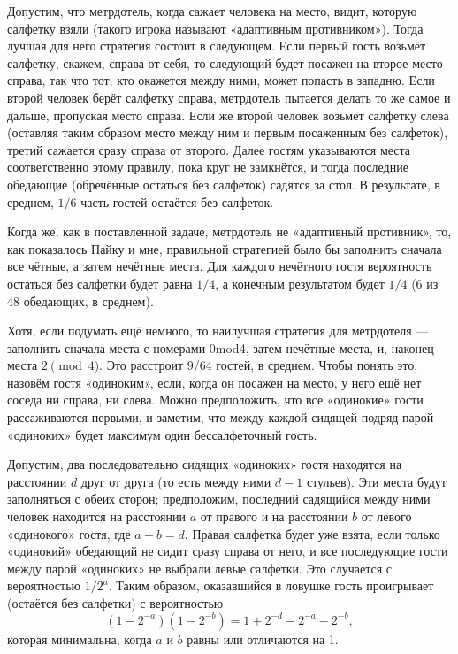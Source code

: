 Допустим, что метрдотель, когда сажает человека на место, видит, которую салфетку взяли (такого игрока называют «адаптивным противником»). %
Тогда лучшая для него стратегия состоит в следующем.
Если первый гость возьмёт салфетку, скажем, справа от себя, то следующий будет посажен на второе место справа, так что тот, кто окажется между ними, может попасть в западню.
Если второй человек берёт салфетку справа, метрдотель пытается делать то же самое и дальше, пропуская место справа.
Если же второй человек возьмёт салфетку слева (оставляя таким образом место между ним и первым посаженным без салфеток), третий сажается сразу справа от второго.
Далее гостям указываются места соответственно этому правилу, пока круг не замкнётся, и тогда последние обедающие (обречённые остаться без салфеток) садятся за стол.
В результате, в среднем, $1/6$ часть гостей остаётся без салфеток.

Когда же, как в поставленной задаче, метрдотель не «адаптивный противник», то, как показалось Пайку и мне, правильной стратегией было бы заполнить сначала все чётные, а затем нечётные места.
Для каждого нечётного гостя вероятность остаться без салфетки будет равна $1/4$, %
а конечным результатом будет $1/4$ (6 из 48 обедающих, в среднем).

Хотя, если подумать ещё немного, то наилучшая стратегия для метрдотеля --- заполнить сначала места с номерами 0mod4, затем нечётные места, и, наконец места $2\pmod4$.
Это расстроит 9/64 гостей, в среднем.
Чтобы понять это, назовём гостя «одиноким», если, когда он посажен на место, у него ещё нет соседа ни справа, ни слева.
Можно предположить, что все «одинокие» гости рассаживаются первыми, и заметим, что между каждой сидящей подряд парой «одиноких» будет максимум один бессалфеточный гость.

Допустим, два последовательно сидящих «одиноких» гостя находятся на расстоянии $d$ друг от друга (то есть между ними $d-1$ стульев).
Эти места будут заполняться с обеих сторон; предположим, последний садящийся между ними человек находится на расстоянии $a$ от правого и на расстоянии $b$ от левого «одинокого» гостя, где $a+b=d$.
Правая салфетка будет уже взята, если только «одинокий» обедающий не сидит сразу справа от него, и все последующие гости между парой «одиноких» не выбрали левые салфетки.
Это случается с вероятностью $1/2^a$.
Таким образом, оказавшийся в ловушке 
гость проигрывает (остаётся без салфетки) с вероятностью
\[(1-2^{-a})(1-2^{-b})=1 + 2^{-d}-2^{-a}-2^{-b},\]
которая минимальна, когда $a$ и $b$ равны или отличаются на 1.

